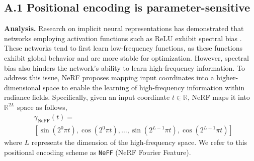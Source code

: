 \documentclass[letterpaper]{article} %
\begin{document}
\subsection{A.1 Positional encoding is parameter-sensitive}
\textbf{Analysis.}
Research on implicit neural representations has demonstrated that networks employing activation functions such as ReLU exhibit spectral bias \cite{pmlrv97rahaman19a}. These networks tend to first learn low-frequency functions, as these functions exhibit global behavior and are more stable for optimization. However, spectral bias also hinders the network's ability to learn high-frequency information. To address this issue, NeRF \cite{mildenhall2020nerf} proposes mapping input coordinates into a higher-dimensional space to enable the learning of high-frequency information within radiance fields. Specifically, given an input coordinate \({t} \in \mathbb{R}\), NeRF maps it into \(\mathbb{R}^{2L}\) space as follows,
\begin{equation}
\label{eq:pe_neff}
\begin{aligned}
    &\gamma_{\text{NeFF}}({t}) = \\ &\left[\sin (2^0 \pi {t}), \cos (2^0 \pi {t}), \ldots, \sin (2^{L-1} \pi {t}), \cos (2^{L-1} \pi {t})\right]
\end{aligned}
\end{equation} where \(L\) represents the dimension of the high-frequency space. We refer to this positional encoding scheme as \texttt{NeFF} (NeRF Fourier Feature).
\end{document}
